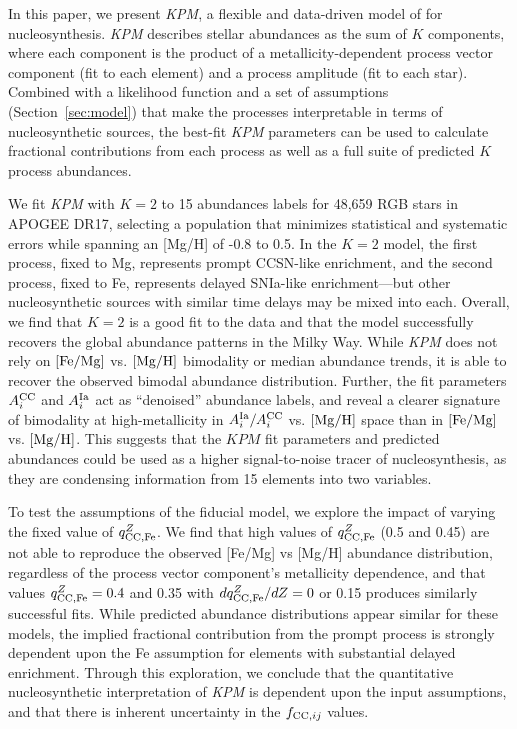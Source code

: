 \documentclass[modern]{aastex631}
\newcommand{\femg}{[{\rm Fe}/{\rm Mg}]}
\newcommand{\mgh}{[{\rm Mg}/{\rm H}]}
\newcommand{\qccFe}{q_{{\rm CC, Fe}}^{Z}}
\newcommand{\dqccFe}{dq_{{\rm CC, Fe}}^{Z}/dZ}
\newcommand{\Acc}{A^{\rm CC}_{i}}
\newcommand{\AIa}{A^{\rm Ia}_{i}}
\newcommand{\fcc}{f_{{\rm CC}, ij}}
\newcommand{\name}{\textsl{KPM}}
\begin{document}
In this paper, we present \name{}, a flexible and data-driven model of for nucleosynthesis. \name{} describes stellar abundances as the sum of $K$ components, where each component is the product of a metallicity-dependent process vector component (fit to each element) and a process amplitude (fit to each star).    Combined with a likelihood function and a set of assumptions (Section~\ref{sec:model}) that make the processes interpretable in terms of nucleosynthetic sources, the best-fit \name{} parameters can be used to calculate fractional contributions from each process as well as a full suite of predicted $K$ process abundances. 

We fit \name{} with $K=2$ to 15 abundances labels for 48,659 RGB stars in APOGEE DR17, selecting a population that minimizes statistical and systematic errors while spanning an [Mg/H] of -0.8 to 0.5. In the $K=2$ model, the first process, fixed to Mg, represents prompt CCSN-like enrichment, and the second process, fixed to Fe, represents delayed SNIa-like enrichment---but other nucleosynthetic sources with similar time delays may be mixed into each. Overall, we find that $K=2$ is a good fit to the data and that the model successfully recovers the global abundance patterns in the Milky Way. While \name{} does not rely on $\femg$ vs. $\mgh$ bimodality or median abundance trends, it is able to recover the observed bimodal abundance distribution. Further, the fit parameters $\Acc$ and $\AIa$ act as ``denoised'' abundance labels, and reveal a clearer signature of bimodality at high-metallicity in $\AIa/\Acc$ vs. $\mgh$ space than in $\femg$ vs. $\mgh$. This suggests that the $KPM$ fit parameters and predicted abundances could be used as a higher signal-to-noise tracer of nucleosynthesis, as they are condensing information from 15 elements into two variables. 

To test the assumptions of the fiducial model, we explore the impact of varying the fixed value of $\qccFe$. We find that high values of $\qccFe$ (0.5 and 0.45) are not able to reproduce the observed [Fe/Mg] vs [Mg/H] abundance distribution, regardless of the process vector component's metallicity dependence, and that values $\qccFe = 0.4$ and 0.35 with $\dqccFe = 0$ or 0.15 produces similarly successful fits. While predicted abundance distributions appear similar for these models, the implied fractional contribution from the prompt process is strongly dependent upon the Fe assumption for elements with substantial delayed enrichment. Through this exploration, we conclude that the quantitative nucleosynthetic interpretation of \name{} is dependent upon the input assumptions, and that there is inherent uncertainty in the $\fcc$ values. 
\end{document}
